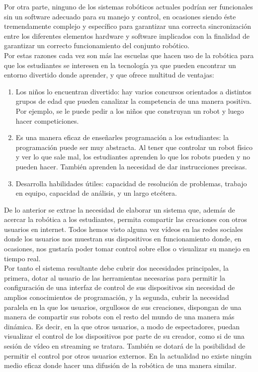 Por otra parte, ninguno de los sistemas robóticos actuales podrían ser funcionales sin un software adecuado para su manejo y control, en ocasiones siendo éste tremendamente complejo y específico para garantizar
una correcta sincronización entre los diferentes elementos hardware y software implicados con la finalidad de garantizar un correcto funcionamiento del conjunto robótico.\\

Por estas razones cada vez son más las escuelas que hacen uso de la robótica para que los estudiantes se interesen en la tecnología ya que pueden encontrar un entorno divertido donde aprender,
y que ofrece multitud de ventajas: 

\begin{enumerate}
\item {Los niños lo encuentran divertido:} hay varios concursos orientados a distintos grupos de edad que pueden canalizar la competencia de una manera positiva. Por ejemplo, se le puede pedir a los niños que construyan un robot y luego hacer competiciones.\\
\item{Es una manera eficaz de enseñarles programación a los estudiantes:}
 la programación puede ser muy abstracta. Al tener que controlar un robot físico y ver lo que sale mal, los estudiantes aprenden lo que los robots pueden y no pueden hacer. 
También aprenden la necesidad de dar instrucciones precisas.\\
\item{ Desarrolla habilidades útiles:}
 capacidad de resolución de problemas, trabajo en equipo, capacidad de análisis, y un largo etcétera.
\end{enumerate}


De lo anterior se extrae la necesidad de elaborar un sistema que, además de acercar la robótica a los estudiantes, permita compartir las creaciones con otros usuarios en internet. Todos hemos visto alguna vez vídeos en las redes sociales donde los usuarios nos muestran sus dispositivos en funcionamiento donde, en ocasiones, nos gustaría poder tomar control sobre ellos o visualizar su manejo en tiempo real.\\

Por tanto el sistema resultante debe cubrir dos necesidades principales, la primera, dotar al usuario de las herramientas necesarias para permitir la configuración de una interfaz de control de sus dispositivos sin necesidad de amplios conocimientos de programación, y la segunda, cubrir la necesidad paralela en la que los usuarios, orgullosos de sus creaciones, dispongan de una manera de compartir sus robots con el resto del mundo de una manera más dinámica. Es decir, en la que otros usuarios, a modo de espectadores, puedan visualizar el control de los dispositivos por parte de su creador, como si de una sesión de vídeo en streaming se tratara. También se dotará de la posibilidad de permitir el control por otros usuarios externos. En la actualidad no existe ningún medio eficaz donde hacer una difusión de la robótica de una manera similar.\\

